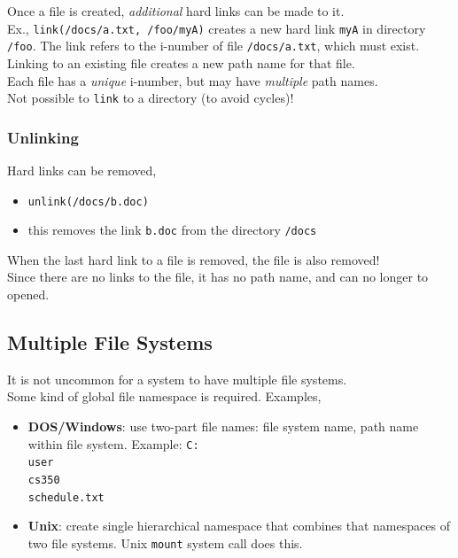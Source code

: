 \documentclass[12pt]{article}
\theoremstyle{plain}
\theoremstyle{definition}
\begin{document}
Once a file is created, \emph{additional} hard links can be made to it. \\
Ex., \texttt{link(/docs/a.txt, /foo/myA)} creates a new hard link \texttt{myA} in directory \texttt{/foo}.
The link refers to the i-number of file \texttt{/docs/a.txt}, which must exist. \\

Linking to an existing file creates a new path name for that file. \\
Each file has a \emph{unique} i-number, but may have \emph{multiple} path names. \\

Not possible to \texttt{link} to a directory (to avoid cycles)!

\subsubsection{Unlinking}
Hard links can be removed,
\begin{itemize}
  \item \texttt{unlink(/docs/b.doc)}
  \item this removes the link \texttt{b.doc} from the directory \texttt{/docs}
\end{itemize}
When the last hard link to a file is removed, the file is also removed! \\
Since there are no links to the file, it has no path name, and can no longer to opened.

\subsection{Multiple File Systems}
It is not uncommon for a system to have multiple file systems. \\

Some kind of global file namespace is required.
Examples,
\begin{itemize}
  \item \textbf{DOS/Windows}: use two-part file names: file system name, path name within file system.
  Example: \texttt{C:\\user\\cs350\\schedule.txt}

  \item \textbf{Unix}: create single hierarchical namespace that combines that namespaces of two file systems.
  Unix \texttt{mount} system call does this.
\end{itemize}
\end{document}
